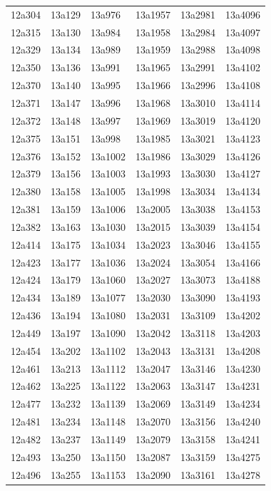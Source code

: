 \documentclass[12pt, oneside]{amsart}
\begin{document}
{\begin{longtable}{*{6}{>{\raggedright\arraybackslash}p{}}}
12a304 & 13a129 & 13a976 & 13a1957 & 13a2981 & 13a4096 \\
12a315 & 13a130 & 13a984 & 13a1958 & 13a2984 & 13a4097 \\
12a329 & 13a134 & 13a989 & 13a1959 & 13a2988 & 13a4098 \\
12a350 & 13a136 & 13a991 & 13a1965 & 13a2991 & 13a4102 \\
12a370 & 13a140 & 13a995 & 13a1966 & 13a2996 & 13a4108 \\
12a371 & 13a147 & 13a996 & 13a1968 & 13a3010 & 13a4114 \\
12a372 & 13a148 & 13a997 & 13a1969 & 13a3019 & 13a4120 \\
12a375 & 13a151 & 13a998 & 13a1985 & 13a3021 & 13a4123 \\
12a376 & 13a152 & 13a1002 & 13a1986 & 13a3029 & 13a4126 \\
12a379 & 13a156 & 13a1003 & 13a1993 & 13a3030 & 13a4127 \\
12a380 & 13a158 & 13a1005 & 13a1998 & 13a3034 & 13a4134 \\
12a381 & 13a159 & 13a1006 & 13a2005 & 13a3038 & 13a4153 \\
12a382 & 13a163 & 13a1030 & 13a2015 & 13a3039 & 13a4154 \\
12a414 & 13a175 & 13a1034 & 13a2023 & 13a3046 & 13a4155 \\
12a423 & 13a177 & 13a1036 & 13a2024 & 13a3054 & 13a4166 \\
12a424 & 13a179 & 13a1060 & 13a2027 & 13a3073 & 13a4188 \\
12a434 & 13a189 & 13a1077 & 13a2030 & 13a3090 & 13a4193 \\
12a436 & 13a194 & 13a1080 & 13a2031 & 13a3109 & 13a4202 \\
12a449 & 13a197 & 13a1090 & 13a2042 & 13a3118 & 13a4203 \\
12a454 & 13a202 & 13a1102 & 13a2043 & 13a3131 & 13a4208 \\
12a461 & 13a213 & 13a1112 & 13a2047 & 13a3146 & 13a4230 \\
12a462 & 13a225 & 13a1122 & 13a2063 & 13a3147 & 13a4231 \\
12a477 & 13a232 & 13a1139 & 13a2069 & 13a3149 & 13a4234 \\
12a481 & 13a234 & 13a1148 & 13a2070 & 13a3156 & 13a4240 \\
12a482 & 13a237 & 13a1149 & 13a2079 & 13a3158 & 13a4241 \\
12a493 & 13a250 & 13a1150 & 13a2087 & 13a3159 & 13a4275 \\
12a496 & 13a255 & 13a1153 & 13a2090 & 13a3161 & 13a4278 \\

\end{longtable}}
\end{document}
